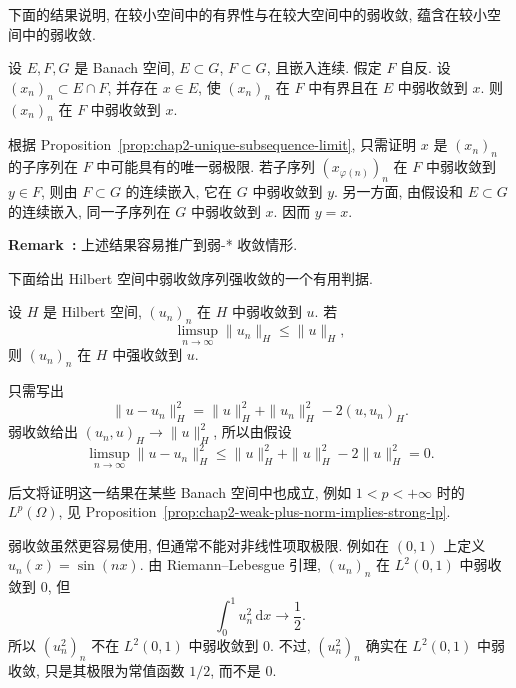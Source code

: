 下面的结果说明, 在较小空间中的有界性与在较大空间中的弱收敛, 蕴含在较小空间中的弱收敛.

\begin{Proposition}
\label{prop:chap2-small-space-weak-convergence}
设 $E,F,G$ 是 Banach 空间, $E\subset G$, $F\subset G$, 且嵌入连续. 假定 $F$ 自反. 设 $(x_n)_n\subset E\cap F$, 并存在 $x\in E$, 使 $(x_n)_n$ 在 $F$ 中有界且在 $E$ 中弱收敛到 $x$. 则 $(x_n)_n$ 在 $F$ 中弱收敛到 $x$.
\end{Proposition}

\begin{Proof}
根据 Proposition~\ref{prop:chap2-unique-subsequence-limit}, 只需证明 $x$ 是 $(x_n)_n$ 的子序列在 $F$ 中可能具有的唯一弱极限. 若子序列 $(x_{\varphi(n)})_n$ 在 $F$ 中弱收敛到 $y\in F$, 则由 $F\subset G$ 的连续嵌入, 它在 $G$ 中弱收敛到 $y$. 另一方面, 由假设和 $E\subset G$ 的连续嵌入, 同一子序列在 $G$ 中弱收敛到 $x$. 因而 $y=x$.
\end{Proof}

\label{rem:chap2-small-space-weak-star}
\par\noindent\textbf{Remark~\thesourceremark:}\quad
上述结果容易推广到弱-* 收敛情形.

下面给出 Hilbert 空间中弱收敛序列强收敛的一个有用判据.

\begin{Proposition}
\label{prop:chap2-hilbert-strong-convergence}
设 $H$ 是 Hilbert 空间, $(u_n)_n$ 在 $H$ 中弱收敛到 $u$. 若
\[
  \limsup_{n\to\infty}\|u_n\|_H\leq\|u\|_H,
\]
则 $(u_n)_n$ 在 $H$ 中强收敛到 $u$.
\end{Proposition}

\begin{Proof}
只需写出
\[
  \|u-u_n\|_H^2=\|u\|_H^2+\|u_n\|_H^2-2(u,u_n)_H.
\]
弱收敛给出 $(u_n,u)_H\to\|u\|_H^2$, 所以由假设
\[
  \limsup_{n\to\infty}\|u-u_n\|_H^2
  \leq\|u\|_H^2+\|u\|_H^2-2\|u\|_H^2=0.
\]
\end{Proof}

后文将证明这一结果在某些 Banach 空间中也成立, 例如 $1<p<+\infty$ 时的 $L^p(\Omega)$, 见 Proposition~\ref{prop:chap2-weak-plus-norm-implies-strong-lp}.

弱收敛虽然更容易使用, 但通常不能对非线性项取极限. 例如在 $(0,1)$ 上定义 $u_n(x)=\sin(nx)$. 由 Riemann--Lebesgue 引理, $(u_n)_n$ 在 $L^2(0,1)$ 中弱收敛到 $0$, 但
\[
  \int_0^1u_n^2\,\mathrm{d}x\longrightarrow\frac12.
\]
所以 $(u_n^2)_n$ 不在 $L^2(0,1)$ 中弱收敛到 $0$. 不过, $(u_n^2)_n$ 确实在 $L^2(0,1)$ 中弱收敛, 只是其极限为常值函数 $1/2$, 而不是 $0$.

